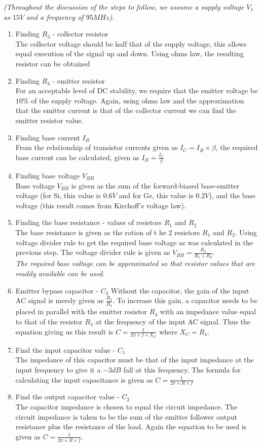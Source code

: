 \documentclass[12pt, a4paper]{article}
\begin{document}
	\textit{(Throughout the discussion of the steps to follow, we assume a supply voltage $V_1$ as $15V$ and a frequency of $95MHz$)}.
	\begin{enumerate}
		\item Finding $R_3$ - collector resistor\\
		The collector voltage should be half that of the supply voltage, this allows equal execution of the signal up and down. Using ohms law, the resulting resistor can be obtained 
		\item Finding $R_4$ - emitter resistor\\
		For an acceptable level of DC stability, we require that the emitter voltage be $10\%$ of the supply voltage. Again, using ohms law and the approximation that the emitter current is that of the collector current we can find the emitter resistor value.
		\item Finding base current $I_B$\\
		From the relationship of transistor currents given as $I_C = I_B \times \beta$, the required base current can be calculated, given as $I_B = \frac{I_C}{\beta}$
		\item Finding base voltage $V_{BB}$\\
		Base voltage $V_{BB}$ is given as the sum of the forward-biased base-emitter voltage (for Si, this value is $0.6V$ and for Ge, this value is $0.2V$), and the base voltage (this result comes from Kirchoff's voltage law).
		\item Finding the base resistance - values of resistors $R_1$ and $R_2$\\
		The base resistance is given as the ration of t he 2 resistors $R_1$ and $R_2$. Using voltage divider rule to get the required base voltage as was calculated in the previous step. The voltage divider rule is given as $V_{BB} = \frac{R_2}{R_1 + R_2}$.
		\\\textit{The required base voltage can be approximated so that resistor values that are readily available can be used.} 
		\item Emitter bypass capacitor - $C_3$
		Without the capacitor, the gain of the input AC signal is merely given as $\frac{R_3}{R_4}$. To increase this gain, a capacitor needs to be placed in parallel with the emitter resistor $R_4$ with an impedance value equal to that of the resistor $R_4$ at the frequency of the input AC signal. Thus the equation giving us this result is $C = \frac{1}{2\pi\times f \times X_C}$ where $X_C = R_4$. 
		\item Find the input capacitor value - $C_1$\\
		The impedance of this capacitor must be that of the input impedance at the input frequency to give it a $-3dB$ fall at this frequency. The formula for calculating the input capacitance is given as $C = \frac{1}{2\pi\times R \times f}$
		\item Find the output capacitor value - $C_2$\\
		The capacitor impedance is chosen to equal the circuit impedance. The circuit impedance is taken to be the sum of the emitter follower output resistance plus the resistance of the load. Again the equation to be used is given as $C = \frac{1}{2\pi \times R \times f}$.


\end{enumerate}
\end{document}
